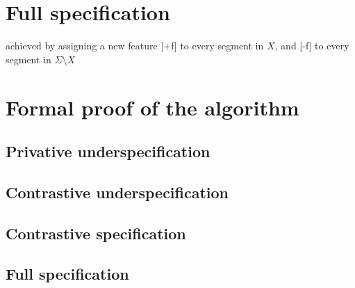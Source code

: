 \documentclass[11pt, oneside]{article}   	%
\begin{document}
\section{Full specification}
achieved by assigning a new feature [+f] to every segment in $X$, and [-f] to every segment in $\Sigma \setminus X$

\appendix

\section{Formal proof of the algorithm}

\subsection{Privative underspecification}

\subsection{Contrastive underspecification}

\subsection{Contrastive specification}

\subsection{Full specification}
\end{document}
